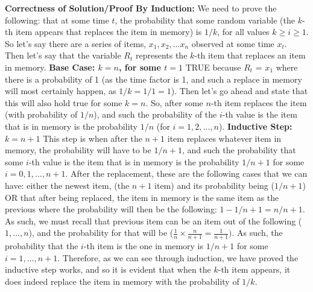 \documentclass[letterpaper, 11pt]{article}
\begin{document}
\textbf{Correctness of Solution/Proof By Induction:}
\newline
\newline
We need to prove the following: that at some time $t$, the probability that some random variable (the $k$-th item appears that replaces the item in memory) is $1/k$, for all values $k \geq i \geq 1$. 
So let's say there are a series of items, $x_1, x_2, ... x_n$ observed at some time $x_t$. Then let's say that the variable $R_t$ represents the $k$-th item that replaces an item in memory. 
\newline
\newline
\textbf{Base Case: $k=n$, for some $t=1$}
\newline
TRUE because $R_t$ = $x_1$ where there is a probability of 1 (as the time factor is 1, and such a replace in memory will most certainly happen, as $1/k=1/1=1$). Then let's go ahead and state that this will also hold true for some $k=n$. So, after some $n$-th item replaces the item (with probability of $1/n$), and such the probability of the $i$-th value is the item that is in memory is the probability $1/n$ (for $i=1,2,...,n$).
\newline
\newline
\textbf{Inductive Step: $k = n + 1$}
\newline
This step is when after the $n+1$ item replaces whatever item in memory, the probability will have to be $1/n+1$, and such the probability that some $i$-th value is the item that is in memory is the probability $1/n+1$ for some $i = 0,1,...,n+1$. After the replacement, these are the following cases that we can have: either the newest item, (the $n+1$ item) and its probability being ($1/n+1$) OR that after being replaced, the item in memory is the same item as the previous where the probability will then be the following: $1-1/n+1=n/n+1$. As such, we must recall that previous item can be an item out of the following ($1,...,n$), and the probability for that will be ($ \frac{1}{n} \times \frac{n}{n+1} = \frac{1}{n+1})$. As such, the probability that the $i$-th item is the one in memory is $1/n+1$ for some $i=1,...,n+1$.
\newline
\newline
Therefore, as we can see through induction, we have proved the inductive step works, and so it is evident that when the $k$-th item appears, it does indeed replace the item in memory with the probability of $1/k$.

\newpage
\end{document}
